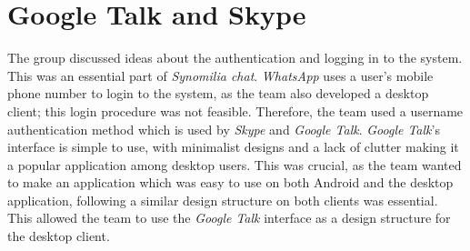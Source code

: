 \documentclass[finalReport.tex]{subfiles}
\begin{document}
\section{Google Talk and Skype}
The group discussed ideas about the authentication and logging in to the system. This was an essential part of \textit{Synomilia chat}. \textit{WhatsApp} uses a user's mobile phone number to login to the system, as the team also developed a desktop client; this login procedure was not feasible. Therefore, the team used a username authentication method which is used by \textit{Skype} and \textit{Google Talk}.
\textit{Google Talk}'s interface is simple to use, with minimalist designs and a lack of clutter making it a popular application among desktop users. This was crucial, as the team wanted to make an application which was easy to use on both Android and the desktop application, following a similar design structure on both clients was essential. This allowed the team to use the \textit{Google Talk} interface as a design structure for the desktop client.
\end{document}
